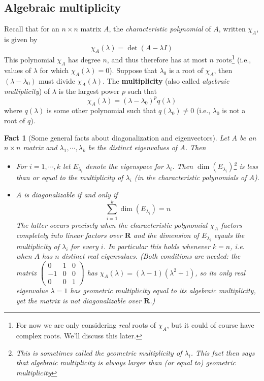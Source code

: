 \documentclass[12pt]{article}
\numberwithin{equation}{subsection}
\numberwithin{figure}{subsection}
\newtheorem{fact}[subsection]{Fact}
\theoremstyle{note}
\begin{document}
\subsection{Algebraic multiplicity} 
Recall that for an $n\times n$ matrix $A$, the \textit{characteristic polynomial} of $A$, written $\chi_A$, is given by \[ \chi_A(\lambda)=\det(A-\lambda I)\]
This polynomial $\chi_A$ has degree $n$, and thus therefore has at most $n$ roots\footnote{For now we are only considering \textit{real} roots of $\chi_A$, but it could of course have complex roots. We'll discuss this later.} (i.e., values of $\lambda$ for which $\chi_A(\lambda)=0$). Suppose that $\lambda_0$ is a root of $\chi_A$, then $(\lambda-\lambda_0)$ must divide $\chi_A(\lambda)$. The \textbf{multiplicity} (also called \textit{algebraic multiplicity}) of $\lambda$ is the largest power $p$ such that \begin{equation} \chi_A(\lambda)=(\lambda-\lambda_0)^p q(\lambda)\end{equation} where $q(\lambda)$ is some other polynomial such that $q(\lambda_0)\neq 0$ (i.e., $\lambda_0$ is not a root of $q$).

\begin{fact}[Some general facts about diagonalization and eigenvectors]
Let $A$ be an $n\times n$ matrix and $\lambda_1,\cdots,\lambda_k$ be the distinct eigenvalues of $A$. Then \begin{itemize}
	\item For $i=1,\cdots, k$ let $E_{\lambda_i}$ denote the eigenspace for $\lambda_i$. Then $\dim(E_{\lambda_i})$\footnote{This is sometimes called the \textit{geometric multiplicity} of $\lambda_i$. This fact then says that algebraic multiplicity is always larger than (or equal to) geometric multiplicity} is less than or equal to the multiplicity of $\lambda_i$ (in the characteristic polynomials of $A$).
	\item $A$ is diagonalizable if and only if \[ \sum_{i=1}^k \dim(E_{\lambda_i})=n\] The latter occurs precisely when the characteristic polynomial $\chi_A$ factors completely into linear factors over $\mathbf{R}$ \textit{and} the dimension of $E_{\lambda_i}$ equals the multiplicity of $\lambda_i$ for every $i$. In particular this holds whenever $k=n$, i.e. when $A$ has $n$ distinct real eigenvalues. (Both conditions are needed: the matrix $\begin{pmatrix} 0 & 1 & 0\\ -1 & 0 & 0 \\ 0&0&1\end{pmatrix}$ has $\chi_A(\lambda)=(\lambda-1)(\lambda^2+1)$, so its only real eigenvalue $\lambda=1$ has geometric multiplicity equal to its algebraic multiplicity, yet the matrix is not diagonalizable over $\mathbf{R}$.) 
\end{itemize}
\end{fact}
\end{document}
